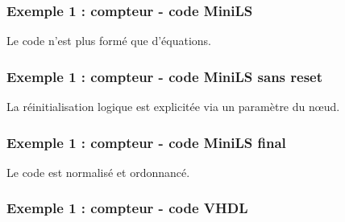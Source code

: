 \documentclass{beamer}
\begin{document}
\begin{frame}
  \frametitle{Exemple 1 : compteur - code MiniLS}

  \footnotesize

  

  Le code n'est plus formé que d'équations.
\end{frame}

\begin{frame}
  \frametitle{Exemple 1 : compteur - code MiniLS sans reset}

  \footnotesize

  

  La réinitialisation logique est explicitée via un paramètre du nœud.
\end{frame}

\begin{frame}
  \frametitle{Exemple 1 : compteur - code MiniLS final}

  \footnotesize

  

  Le code est normalisé et ordonnancé.
\end{frame}

\begin{frame}
  \frametitle{Exemple 1 : compteur - code VHDL}

  \tiny

  \begin{columns}[t]
    \hspace{1cm}
    \begin{column}{6cm}
      
    \end{column}
    \begin{column}{6cm}
      
    \end{column}
  \end{columns}
\end{frame}
\end{document}
